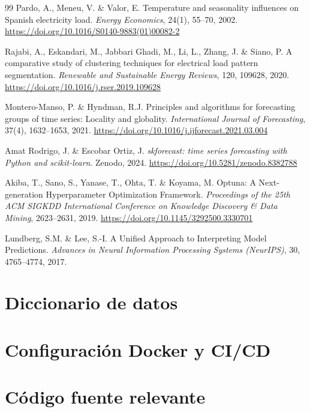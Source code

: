 \documentclass[12pt, a4paper]{article}
\begin{document}
\begin{thebibliography}{99}
Pardo, A., Meneu, V. \& Valor, E. Temperature and seasonality influences on Spanish electricity load. \textit{Energy Economics}, 24(1), 55--70, 2002.
\url{https://doi.org/10.1016/S0140-9883(01)00082-2}

Rajabi, A., Eskandari, M., Jabbari Ghadi, M., Li, L., Zhang, J. \& Siano, P. A comparative study of clustering techniques for electrical load pattern segmentation. \textit{Renewable and Sustainable Energy Reviews}, 120, 109628, 2020.
\url{https://doi.org/10.1016/j.rser.2019.109628}

Montero-Manso, P. \& Hyndman, R.J. Principles and algorithms for forecasting groups of time series: Locality and globality. \textit{International Journal of Forecasting}, 37(4), 1632--1653, 2021.
\url{https://doi.org/10.1016/j.ijforecast.2021.03.004}

Amat Rodrigo, J. \& Escobar Ortiz, J. \textit{skforecast: time series forecasting with Python and scikit-learn}. Zenodo, 2024.
\url{https://doi.org/10.5281/zenodo.8382788}

Akiba, T., Sano, S., Yanase, T., Ohta, T. \& Koyama, M. Optuna: A Next-generation Hyperparameter Optimization Framework. \textit{Proceedings of the 25th ACM SIGKDD International Conference on Knowledge Discovery \& Data Mining}, 2623--2631, 2019.
\url{https://doi.org/10.1145/3292500.3330701}

Lundberg, S.M. \& Lee, S.-I. A Unified Approach to Interpreting Model Predictions. \textit{Advances in Neural Information Processing Systems (NeurIPS)}, 30, 4765--4774, 2017.

\end{thebibliography}

\newpage
\appendix

\section{Diccionario de datos}
\section{Configuración Docker y CI/CD}
\section{Código fuente relevante}
\end{document}
